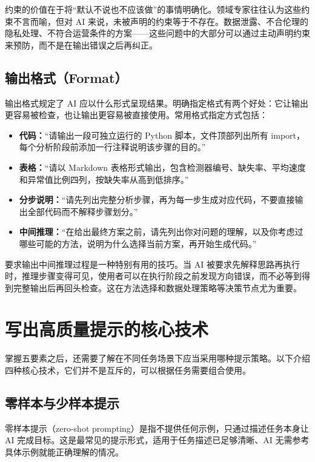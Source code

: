约束的价值在于将“默认不说也不应该做”的事情明确化。领域专家往往认为这些约束不言而喻，但对 AI 来说，未被声明的约束等于不存在。数据泄露、不合伦理的隐私处理、不符合运营条件的方案——这些问题中的大部分可以通过主动声明约束来预防，而不是在输出错误之后再纠正。

\subsection{输出格式（Format）}

输出格式规定了 AI 应以什么形式呈现结果。明确指定格式有两个好处：它让输出更容易被检查，也让输出更容易被直接使用。常用格式指定方式包括：

\begin{itemize}
  \item \textbf{代码：}“请输出一段可独立运行的 Python 脚本，文件顶部列出所有 import，每个分析阶段前添加一行注释说明该步骤的目的。”
  \item \textbf{表格：}“请以 Markdown 表格形式输出，包含检测器编号、缺失率、平均速度和异常值比例四列，按缺失率从高到低排序。”
  \item \textbf{分步说明：}“请先列出完整分析步骤，再为每一步生成对应代码，不要直接输出全部代码而不解释步骤划分。”
  \item \textbf{中间推理：}“在给出最终方案之前，请先列出你对问题的理解，以及你考虑过哪些可能的方法，说明为什么选择当前方案，再开始生成代码。”
\end{itemize}

要求输出中间推理过程是一种特别有用的技巧。当 AI 被要求先解释思路再执行时，推理步骤变得可见，使用者可以在执行阶段之前发现方向错误，而不必等到得到完整输出后再回头检查。这在方法选择和数据处理策略等决策节点尤为重要。

\section{写出高质量提示的核心技术}

掌握五要素之后，还需要了解在不同任务场景下应当采用哪种提示策略。以下介绍四种核心技术，它们并不是互斥的，可以根据任务需要组合使用。

\subsection{零样本与少样本提示}

零样本提示（zero-shot prompting）是指不提供任何示例，只通过描述任务本身让 AI 完成目标。这是最常见的提示形式，适用于任务描述已足够清晰、AI 无需参考具体示例就能正确理解的情况。

